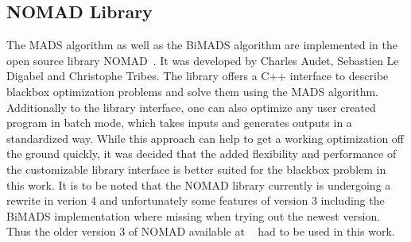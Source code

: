 \documentclass[a4paper,10pt]{article}
\begin{document}
    \subsection{NOMAD Library}

    The MADS algorithm as well as the BiMADS algorithm are implemented in the
    open source library NOMAD~\cite{nomad3}.
    It was developed by Charles Audet, Sebastien Le Digabel
    and Christophe Tribes.
    The library offers a C++ interface to describe blackbox optimization
    problems and solve them using the MADS algorithm.
    Additionally to the library interface, one can also optimize
    any user created program in batch mode, which takes inputs and generates
    outputs in a standardized way.
    While this approach can help to get a working optimization
    off the ground quickly, it was decided that the added
    flexibility and performance of the customizable library interface
    is better suited for the blackbox problem in this work.
    It is to be noted that the NOMAD library currently is undergoing
    a rewrite in verion 4 and unfortunately some features of version 3
    including the BiMADS implementation where missing when trying out
    the newest version.
    Thus the older version 3 of NOMAD available at 
    ~\cite{nomad_website} had to be used in this work.
\end{document}

